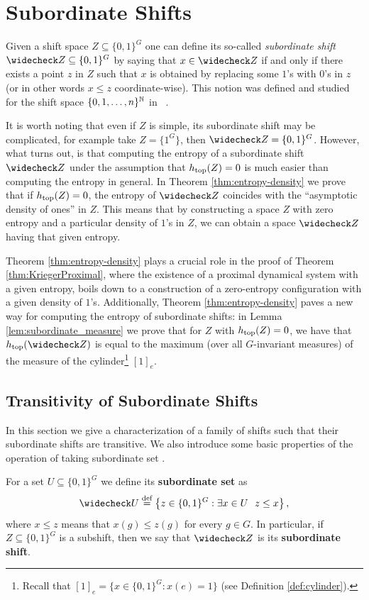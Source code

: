 \chapter{Subordinate Shifts}\label{chapter:subordinate}

Given a shift space $Z\subseteq\{0,1\}^G$ one can define its so-called \emph{subordinate shift} $\subord{Z}\subseteq\{0,1\}^G$ by saying that $x\in \subord{Z}$ if and only if there exists a point $z$ in $Z$ such that $x$ is obtained by replacing some $1$'s with $0$'s in $z$ (or in other words $x\leq z$ coordinate-wise). This notion was defined and studied for the shift space $\{0,1,\ldots,n\}^{\mathbb{N}}$ in ~\cite{KKL18}.

It is worth noting that even if $Z$ is simple, its subordinate shift may be complicated, for example take $Z=\{1^G\}$, then $\subord{Z}=\{0,1\}^G$.
%
However, what turns out, is that computing the entropy of a subordinate shift $\subord{Z}$ under the assumption that $h_\mathrm{top}(Z)=0$ is much easier than computing the entropy in general.
%
In Theorem \ref{thm:entropy-density} we prove that if $h_\mathrm{top}(Z)=0$, the entropy of $\subord{Z}$ coincides with the ``asymptotic density of ones'' in $Z$.
%
This means that by constructing a space $Z$ with zero entropy and a particular density of $1$'s in $Z$, we can obtain a space $\subord{Z}$ having that given entropy.


 Theorem \ref{thm:entropy-density} plays a crucial role in the proof of Theorem \ref{thm:KriegerProximal}, where the existence of a proximal dynamical system with a given entropy, boils down to a construction of a zero-entropy configuration with a given density of $1$'s.
 Additionally, Theorem \ref{thm:entropy-density} paves a new way for computing the entropy of subordinate shifts: in Lemma \ref{lem:subordinate_measure} we prove that for $Z$ with $h_\mathrm{top}(Z)=0$, we have that $\htop(\subord{Z})$ is equal to the maximum (over all $G$-invariant measures) of the measure of the cylinder\footnote{Recall that $[1]_e=\{x\in\{0,1\}^G:x(e)=1\}$ (see Definition \ref{def:cylinder}).} $[1]_e$. 
%

\section{Transitivity of Subordinate Shifts}
In this section we give a characterization of a family of shifts such that their subordinate shifts are transitive. We also introduce some basic properties of the operation of taking subordinate set .

\begin{defn}
For a set $U\subseteq \{0,1\}^G$ we define its {\bf subordinate set} as
\[
\subord{U}\defeq\inbrace{z\in\{0,1\}^G: \exists x\in U~~z\leq x },
\]
where $x\leq z$ means that $x(g)\leq z(g)$ for every $g\in G$.
In particular, if $Z\subseteq \{0,1\}^G$ is a subshift, then we say that $\subord{Z}$ is its {\bf subordinate shift}.
\end{defn}

